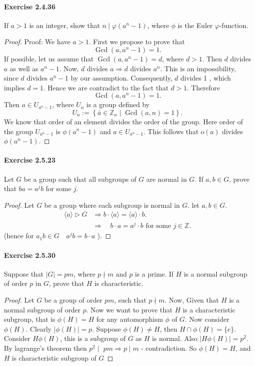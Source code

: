 \documentclass{article}
\begin{document}
\paragraph{Exercise 2.4.36} If $a > 1$ is an integer, show that $n \mid \varphi(a^n - 1)$, where $\phi$ is the Euler $\varphi$-function.
\begin{proof}
    Proof: We have $a>1$. First we propose to prove that
$$
\operatorname{Gcd}\left(a, a^n-1\right)=1 .
$$
If possible, let us assume that
$\operatorname{Gcd}\left(a, a^n-1\right)=d$, where $d>1$.
Then
$d$ divides $a$ as well as $a^n-1$.
Now,
$d$ divides $a \Longrightarrow d$ divides $a^n$.
This is an impossibility, since $d$ divides $a^n-1$ by our assumption. Consequently, $d$ divides 1 , which implies $d=1$. Hence we are contradict to the fact that $d>1$. Therefore
$$
\operatorname{Gcd}\left(a, a^n-1\right)=1 .
$$
Then $a \in U_{a^n-1}$, where $U_n$ is a group defined by
$$
U_n:=\left\{\bar{a} \in \mathbb{Z}_n \mid \operatorname{Gcd}(a, n)=1\right\} .
$$
We know that order of an element divides the order of the group. Here order of the group $U_{a^n-1}$ is $\phi\left(a^n-1\right)$ and $a \in U_{a^n-1}$. This follows that $\mathrm{o}(a)$ divides $\phi\left(a^n-1\right)$.
\end{proof}


\paragraph{Exercise 2.5.23} Let $G$ be a group such that all subgroups of $G$ are normal in $G$. If $a, b \in G$, prove that $ba = a^jb$ for some $j$.
\begin{proof}
    Let $G$ be a group where each subgroup is normal in $G$. let $a, b \in G$.
$$
\begin{aligned}
    \langle a\rangle\triangleright  G  &\Rightarrow b \cdot\langle a\rangle=\langle a\rangle \cdot b . \\
& \Rightarrow \quad b \cdot a=a^j \cdot b \text { for some } j \in \mathbb{Z}.
\end{aligned}
$$
(hence for $a_1 b \in G \quad a^j b=b \cdot a$ ).
\end{proof}



\paragraph{Exercise 2.5.30} Suppose that $|G| = pm$, where $p \nmid m$ and $p$ is a prime. If $H$ is a normal subgroup of order $p$ in $G$, prove that $H$ is characteristic.
\begin{proof}
    Let $G$ be a group of order $p m$, such that $p \nmid m$. Now, Given that $H$ is a normal subgroup of order $p$. Now we want to prove that $H$ is a characteristic subgroup, that is $\phi(H)=H$ for any automorphism $\phi$ of $G$. Now consider $\phi(H)$. Clearly $|\phi(H)|=p$. Suppose $\phi(H) \neq H$, then $H \cap \phi (H)=\{ e\}$. Consider $H \phi(H)$, this is a subgroup of $G$ as $H$ is normal. Also $|H \phi(H)|=p^2$. By lagrange's theorem then $p^2 \mid$ $p m \Longrightarrow p \mid m$ - contradiction. So $\phi(H)=H$, and $H$ is characteristic subgroup of $G$
\end{proof}
\end{document}
